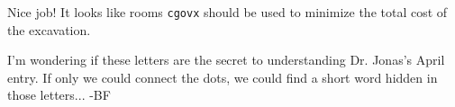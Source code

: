 Nice job! It looks like rooms \texttt{cgovx} should be used to
minimize the total cost of the excavation.

I'm wondering if these letters are the secret to understanding
Dr. Jonas's April entry. If only we could connect the dots,
we could find a short word hidden in those letters... -BF
